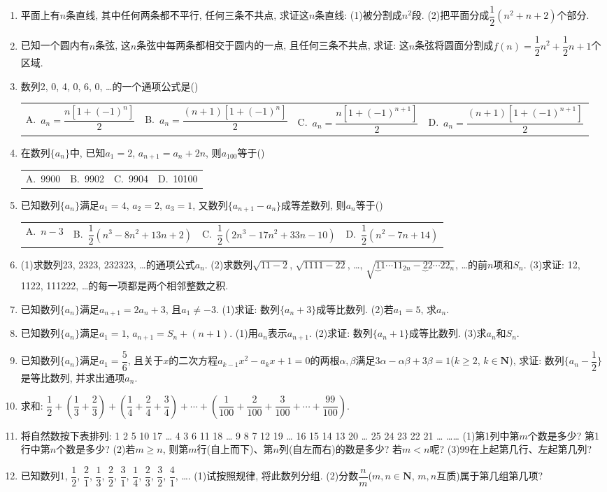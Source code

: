 \documentclass[10pt,a4paper]{article}
\newcommand{\fourch}[4]{\par\begin{tabular}{p{.23\textwidth}p{.23\textwidth}p{.23\textwidth}p{.23\textwidth}}
A.~#1 &B.~#2& C.~#3& D.~#4
\end{tabular}}
\begin{document}
\begin{enumerate}[1.]
\item 平面上有$n$条直线, 其中任何两条都不平行, 任何三条不共点, 求证这$n$条直线:
(1)被分割成$n^2$段.
(2)把平面分成$\dfrac 12(n^2+n+2)$个部分.
\item 已知一个圆内有$n$条弦, 这$n$条弦中每两条都相交于圆内的一点, 且任何三条不共点, 求证: 这$n$条弦将圆面分割成$f(n)=\dfrac 12n^2+\dfrac 12n+1$个区域.
\item 数列2, 0, 4, 0, 6, 0, …的一个通项公式是()
\fourch{$a_n=\dfrac{n[1+(-1)^n]}2$}{$a_n=\dfrac{(n+1)[1+(-1)^n]}2$}{$a_n=\dfrac{n[1+(-1)^{n+1}]}2$}{$a_n=\dfrac{(n+1)[1+(-1)^{n+1}]}2$}
\item 在数列$\{a_n\}$中, 已知$a_1=2$, $a_{n+1}=a_n+2n$, 则$a_{100}$等于()
\fourch{9900}{9902}{9904}{10100}
\item 已知数列$\{a_n\}$满足$a_1=4$, $a_2=2$, $a_3=1$, 又数列$\{a_{n+1}-a_n\}$成等差数列, 则$a_n$等于()
\fourch{$n-3$}{$\dfrac 12(n^3-8n^2+13n+2)$}{$\dfrac 12(2n^3-17n^2+33n-10)$}{$\dfrac 12(n^2-7n+14)$}
\item (1)求数列23, 2323, 232323, …的通项公式$a_n$.
(2)求数列$\sqrt {11-2}$, $\sqrt {1111-22}$, …, $\sqrt {\underbrace11\cdots 11_{2n}-\underbrace22\cdots 22_n}$, …的前$n$项和$S_n$.
(3)求证: 12, 1122, 111222, …的每一项都是两个相邻整数之积.
\item 已知数列$\{a_n\}$满足$a_{n+1}=2a_n+3$, 且$a_1\ne -3$.
(1)求证: 数列$\{a_n+3\}$成等比数列.
(2)若$a_1=5$, 求$a_n$.
\item 已知数列$\{a_n\}$满足$a_1=1$, $a_{n+1}=S_n+(n+1)$.
(1)用$a_n$表示$a_{n+1}$.
(2)求证: 数列$\{a_n+1\}$成等比数列.
(3)求$a_n$和$S_n$.
\item 已知数列$\{a_n\}$满足$a_1=\dfrac 56$, 且关于$x$的二次方程$a_{k-1}x^2-a_kx+1=0$的两根$\alpha ,\beta$满足$3\alpha -\alpha \beta +3\beta =1$($k\ge 2$, $k\in \mathbf{N}$), 求证: 数列$\{a_n-\dfrac 12\}$是等比数列, 并求出通项$a_n$.
\item 求和: $\dfrac 12+(\dfrac 13+\dfrac 23)+(\dfrac 14+\dfrac 24+\dfrac 34)+\cdots +(\dfrac 1{100}+\dfrac 2{100}+\dfrac 3{100}+\cdots +\dfrac{99}{100})$.
\item 将自然数按下表排列:
1	2	5	10	17	…
4	3	6	11	18	…
9	8	7	12	19	…
16	15	14	13	20	…
25	24	23	22	21	…
……					
(1)第1列中第$m$个数是多少? 第1行中第$n$个数是多少?
(2)若$m\ge n$, 则第$m$行(自上而下)、第$n$列(自左而右)的数是多少? 若$m<n$呢?
(3)99在上起第几行、左起第几列?
\item 已知数列1, $\dfrac 12$, $\dfrac 21$, $\dfrac 13$, $\dfrac 22$, $\dfrac 31$, $\dfrac 14$, $\dfrac 23$, $\dfrac 32$, $\dfrac 41$, ….
(1)试按照规律, 将此数列分组.
(2)分数$\dfrac nm$($m,n\in \mathbf{N}$, $m,n$互质)属于第几组第几项?

\end{enumerate}
\end{document}
